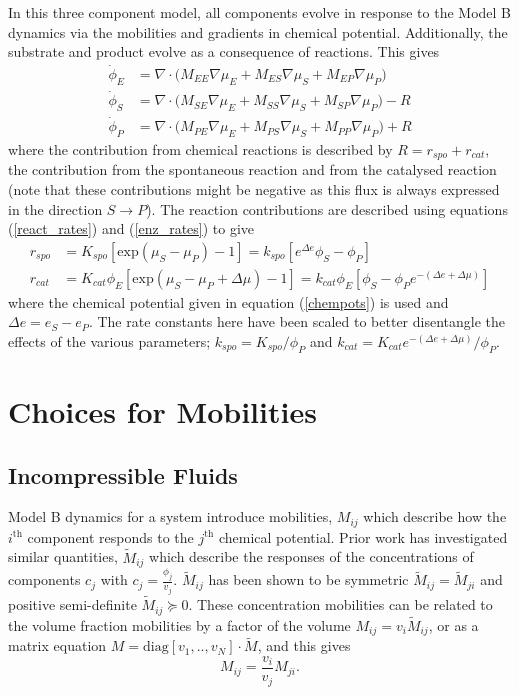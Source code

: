 In this three component model, all components evolve in response to the Model B dynamics via the mobilities and gradients in chemical potential. Additionally, the substrate and product evolve as a consequence of reactions. This gives
\begin{align}
    \dot{\phi}_E &= \nabla \cdot \big(M_{EE}\nabla\mu_E + M_{ES}\nabla\mu_S + M_{EP}\nabla\mu_P) \label{evoE}\\
    \dot{\phi}_S &= \nabla \cdot \big(M_{SE}\nabla\mu_E + M_{SS}\nabla\mu_S + M_{SP}\nabla\mu_P) - R \label{evoS}\\
    \dot{\phi}_P &= \nabla \cdot \big(M_{PE}\nabla\mu_E + M_{PS}\nabla\mu_S + M_{PP}\nabla\mu_P) + R \label{evoP}
\end{align}
where the contribution from chemical reactions is described by $R = r_{spo} + r_{cat}$, the contribution from the spontaneous reaction and from the catalysed reaction (note that these contributions might be negative as this flux is always expressed in the direction $S \rightarrow P$). The reaction contributions are described using equations (\ref{react_rates}) and (\ref{enz_rates}) to give
\begin{align}
    r_{spo} &= K_{spo}[\text{exp}(\mu_S-\mu_P) - 1] = k_{spo}[e^{\Delta e}\phi_S - \phi_P] \\
    r_{cat} &= K_{cat}\phi_E[\text{exp}(\mu_S - \mu_P + \Delta\mu) - 1] = k_{cat}\phi_E[\phi_S-\phi_P e^{-(\Delta e+ \Delta\mu)}]
\end{align}
where the chemical potential given in equation (\ref{chempots}) is used and $\Delta e = e_S - e_P$. The rate constants here have been scaled to better disentangle the effects of the various parameters; $k_{spo} = K_{spo}/\phi_P$ and $k_{cat} = K_{cat}e^{-(\Delta e + \Delta \mu)}/\phi_P$.

\section{Choices for Mobilities}
\subsection{Incompressible Fluids}

Model B dynamics for a system introduce mobilities, $M_{ij}$ which describe how the $i^{\text{th}}$ component responds to the $j^{\text{th}}$ chemical potential. Prior work has investigated similar quantities, $\widetilde{M}_{ij}$ which describe the responses of the concentrations of components $c_j$ with $c_j = \frac{\phi_j}{v_j}$. $\widetilde{M}_{ij}$ has been shown to be symmetric $\widetilde{M}_{ij} = \widetilde{M}_{ji}$ and positive semi-definite $\widetilde{M}_{ij} \succcurlyeq 0$\cite{onsager_reciprocal_1931}. These concentration mobilities can be related to the volume fraction mobilities by a factor of the volume ${M}_{ij} = v_i\widetilde{M}_{ij}$, or as a matrix equation $M = \text{diag}[v_1, .., v_N]\cdot\widetilde{M}$, and this gives
\begin{equation}
    {M}_{ij} = \frac{v_i}{v_j}{M}_{ji}.
    \label{mobsym}
\end{equation}

